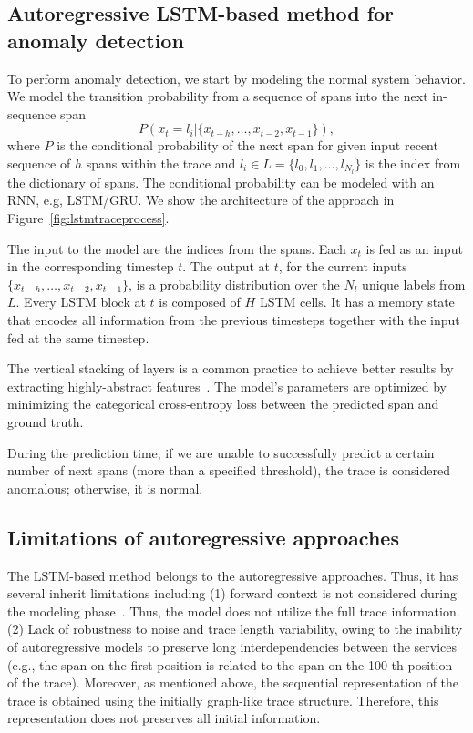 \subsection{Autoregressive LSTM-based method for anomaly detection}
To perform anomaly detection, we start by modeling the normal system behavior. We model the transition probability from a sequence of spans into the next in-sequence span
\begin{equation}
     P(x_t=l_i|\{x_{t-h}, \dots, x_{t-2}, x_{t-1}\}),
\end{equation}
where $P$ is the conditional probability of the next span for given input
recent sequence of $h$ spans within the trace and $l_i \in L=\{l_0, l_1, \dots, l_{N_l}\}$ is the index from the dictionary of spans. The conditional probability can be modeled with an RNN, e.g, LSTM/GRU. We show the architecture of the approach in Figure~\ref{fig:lstmtraceprocess}.

The input to the model are the indices from the spans. Each $x_t$ is fed as an input in the corresponding timestep $t$. The output at $t$, for the current inputs $\{x_{t-h}, \dots, x_{t-2}, x_{t-1}\}$, is a probability distribution over the $N_l$ unique labels from $L$. 
Every LSTM block at $t$ is composed of $H$ LSTM cells. 
It has a memory state that encodes all information from the previous timesteps together with the input fed at the same timestep.

The vertical stacking of layers is a common practice to achieve better results by extracting highly-abstract features~\cite{Hundman:2018:DSA:3219819.3219845,vincent2010stacked}. The model's parameters are optimized by minimizing the categorical cross-entropy loss between the predicted span and ground truth.

During the prediction time, if we are unable to successfully predict a certain number of next spans (more than a specified threshold), the trace is considered anomalous; otherwise, it is normal.

\subsection{Limitations of autoregressive approaches}
The LSTM-based method belongs to the autoregressive approaches. Thus, it has several inherit limitations including (1) forward context is not considered during the modeling phase~\cite{devlin2018bert}. Thus, the model does not utilize the full trace information. (2) Lack of robustness to noise and trace length variability, owing to the inability of autoregressive models to preserve long interdependencies between the services (e.g., the span on the first position is related to the span on the 100-th position of the trace). Moreover, as mentioned above, the sequential representation of the trace is obtained using the initially graph-like trace structure. Therefore, this representation does not preserves all initial information. 

